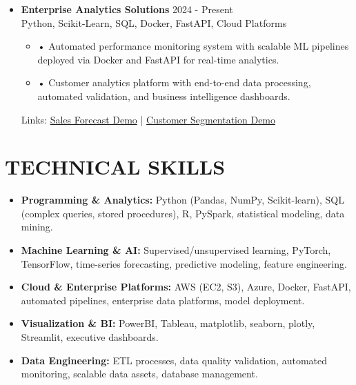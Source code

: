 \documentclass[a4paper,9pt]{extarticle}
\begin{document}
\begin{itemize}[leftmargin=0.4cm, label={}]
    \item \textbf{Enterprise Analytics Solutions} \hfill 2024 - Present \\
    Python, Scikit-Learn, SQL, Docker, FastAPI, Cloud Platforms
    \begin{itemize}[leftmargin=0.3cm, label={}]
    \item \small{•} \normalsize{Automated performance monitoring system with scalable ML pipelines deployed via Docker and FastAPI for real-time analytics.} 
    \item \small{•} \normalsize{Customer analytics platform with end-to-end data processing, automated validation, and business intelligence dashboards.}
    \end{itemize}
    Links: \href{https://twallett.com/sales-forecast}{Sales Forecast Demo} | \href{https://twallett.com/customer-segmentation}{Customer Segmentation Demo} 
\end{itemize}

\section*{TECHNICAL SKILLS}

\begin{itemize}[leftmargin=0.5cm, label={}]
    \item \textbf{Programming \& Analytics:} Python (Pandas, NumPy, Scikit-learn), SQL (complex queries, stored procedures), R, PySpark, statistical modeling, data mining. \\
    
    \item \textbf{Machine Learning \& AI:} Supervised/unsupervised learning, PyTorch, TensorFlow, time-series forecasting, predictive modeling, feature engineering. \\
    
    \item \textbf{Cloud \& Enterprise Platforms:} AWS (EC2, S3), Azure, Docker, FastAPI, automated pipelines, enterprise data platforms, model deployment. \\
    
    \item \textbf{Visualization \& BI:} PowerBI, Tableau, matplotlib, seaborn, plotly, Streamlit, executive dashboards. \\
    
    \item \textbf{Data Engineering:} ETL processes, data quality validation, automated monitoring, scalable data assets, database management.
\end{itemize}

\end{document}
